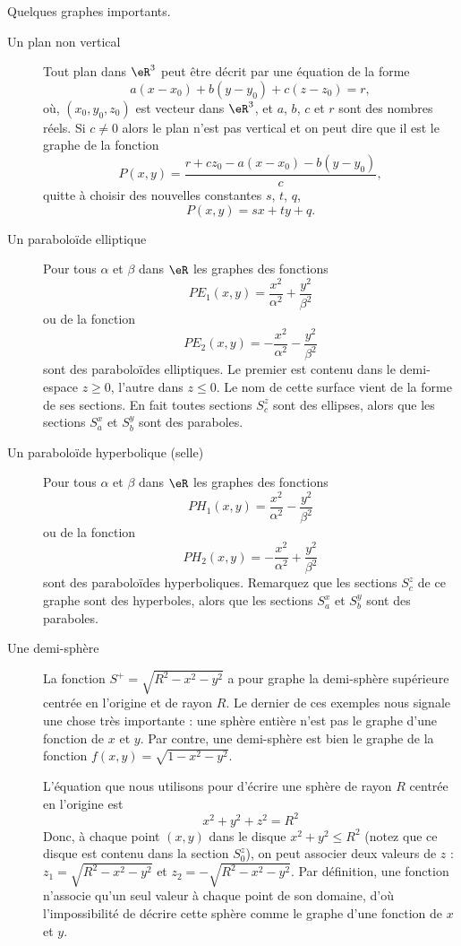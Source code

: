 \begin{example}
	Quelques graphes importants.
  \begin{description}
    \item[Un plan non vertical] Tout plan dans $\eR^3$ peut être décrit par une équation de la forme
\[
a(x-x_0)+ b(y-y_0) + c(z-z_0) = r,
\]
où, $(x_0, y_0, z_0)$ est vecteur dans $\eR^3$, et $a$, $b$, $c$ et $r$ sont des nombres réels. Si $c\neq 0$ alors le plan n'est pas vertical et on peut dire que il est le graphe de la fonction
\[
P(x,y)= \frac{r+cz_0 -a(x-x_0)-b(y-y_0)}{c},
\]
quitte à choisir des nouvelles constantes $s$, $t$, $q$,
\[
P(x,y)=sx +ty +q.
\]
    \item[Un paraboloïde elliptique] Pour tous $\alpha$ et $\beta$ dans $\eR$ les  graphes des fonctions
\[
PE_1(x,y)=\frac{x^2}{\alpha^2}+\frac{y^2}{\beta^2}
\]
ou de la fonction
\[
PE_2(x,y)=-\frac{x^2}{\alpha^2}-\frac{y^2}{\beta^2}
\]
sont des paraboloïdes elliptiques. Le premier est contenu dans le demi-espace $z\geq 0$, l'autre dans $z\leq 0$. Le nom de cette surface vient de la forme de ses sections. En fait toutes  sections $S^z_c$ sont des ellipses, alors que les sections $S^x_a$ et $S^y_b$ sont des paraboles.
    \item[Un paraboloïde hyperbolique (selle)]  Pour tous $\alpha$ et $\beta$ dans $\eR$ les  graphes des fonctions
\[
PH_1(x,y)=\frac{x^2}{\alpha^2}-\frac{y^2}{\beta^2}
\]
ou de la fonction
\[
PH_2(x,y)=-\frac{x^2}{\alpha^2}+\frac{y^2}{\beta^2}
\]
sont des paraboloïdes hyperboliques. Remarquez que les  sections $S^z_c$ de ce graphe sont des hyperboles, alors que les sections $S^x_a$ et $S^y_b$ sont des paraboles.
    \item[Une demi-sphère] La fonction $S^+=\sqrt{R^2-x^2-y^2}$ a pour graphe la demi-sphère supérieure centrée en l'origine et de rayon $R$.
Le dernier de ces exemples nous signale une chose très importante : une sphère entière n'est pas le graphe d'une fonction de $x$ et $y$. Par contre, une demi-sphère est bien le graphe de la fonction $f(x,y)=\sqrt{1-x^2-y^2}$.

L'équation que nous utilisons  pour d'écrire une sphère de rayon $R$ centrée en l'origine est
\[
x^2+y^2+z^2=R^2
\]
Donc, à  chaque point  $(x,y)$ dans le disque $x^2+y^2\leq R^2$ (notez que ce disque est contenu dans la section $S^z_0$), on peut associer deux valeurs de $z$ : $z_1=\sqrt{R^2-x^2-y^2}$ et  $z_2=-\sqrt{R^2-x^2-y^2}$. Par définition, une fonction n'associe qu'un seul valeur à chaque point de son domaine, d'où l'impossibilité de décrire cette sphère comme le graphe d'une fonction de $x$ et $y$.

  \end{description}
\end{example}


